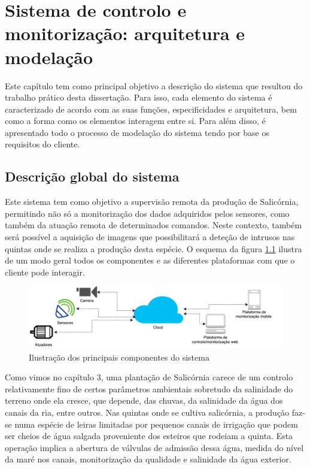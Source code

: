 

\chapter{Sistema de controlo e monitorização: arquitetura e modelação}


Este capítulo tem como principal objetivo a descrição do sistema que resultou do trabalho prático
desta dissertação. Para isso, cada elemento do sistema é caracterizado de acordo com as suas funções, especificidades e arquitetura, bem como a forma como os elementos interagem entre si. Para além disso, é apresentado todo o processo de modelação do sistema tendo por base os requisitos do cliente. 








\section{Descrição global do sistema}

Este sistema tem como objetivo a supervisão remota da produção de Salicórnia, permitindo não só a monitorização dos dados adquiridos pelos sensores, como também da atuação remota de determinados comandos. Neste contexto, também será possível a aquisição de imagens que possibilitará a deteção de intrusos nas quintas onde se realiza a produção desta espécie. O esquema da figura \ref{componentesalla} ilustra de um modo geral todos os componentes e as diferentes plataformas com que o cliente pode interagir. 


\begin{figure}[!htb]
	\centering
	\includegraphics[scale=0.48]{esquemas/global_arquitetura.pdf}
	\caption{Ilustração dos principais componentes do sistema}
	\label{componentesalla}
\end{figure}






Como vimos no capítulo 3, uma plantação de  Salicórnia carece de um controlo relativamente fino de certos parâmetros ambientais sobretudo da salinidade do terreno onde ela cresce, que depende, das chuvas, da salinidade da água dos canais da ria, entre outros. Nas quintas onde se cultiva salicórnia, a produção faz-se numa espécie de leiras limitadas por pequenos canais de irrigação que podem ser cheios de água salgada proveniente dos esteiros que rodeiam a quinta. Esta operação implica a abertura de válvulas de admissão dessa água, medida do nível da maré nos canais, monitorização da qualidade e salinidade da água exterior.



